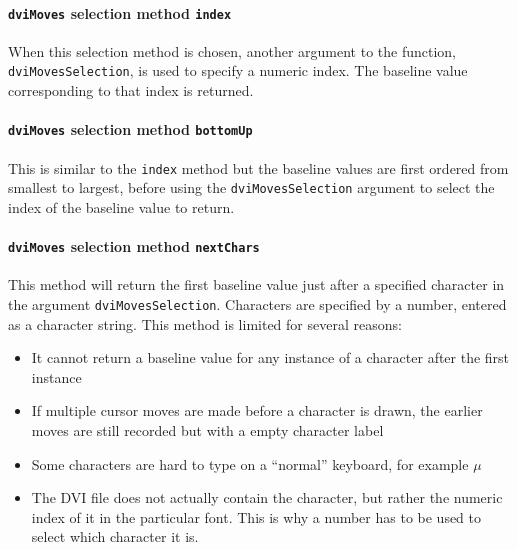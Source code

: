 \documentclass[]{article}
\providecommand{\tightlist}{%
  \setlength{\itemsep}{0pt}\setlength{\parskip}{0pt}}
\let\oldparagraph\paragraph
\renewcommand{\paragraph}[1]{\oldparagraph{#1}\mbox{}}
\begin{document}
\paragraph{\texorpdfstring{\texttt{dviMoves} selection method
\texttt{index}}{dviMoves selection method index}}\label{dvimoves-selection-method-index}

When this selection method is chosen, another argument to the function,
\texttt{dviMovesSelection}, is used to specify a numeric index. The
baseline value corresponding to that index is returned.

\paragraph{\texorpdfstring{\texttt{dviMoves} selection method
\texttt{bottomUp}}{dviMoves selection method bottomUp}}\label{dvimoves-selection-method-bottomup}

This is similar to the \texttt{index} method but the baseline values are
first ordered from smallest to largest, before using the
\texttt{dviMovesSelection} argument to select the index of the baseline
value to return.

\paragraph{\texorpdfstring{\texttt{dviMoves} selection method
\texttt{nextChars}}{dviMoves selection method nextChars}}\label{dvimoves-selection-method-nextchars}

This method will return the first baseline value just after a specified
character in the argument \texttt{dviMovesSelection}. Characters are
specified by a number, entered as a character string. This method is
limited for several reasons:

\begin{itemize}
\tightlist
\item
  It cannot return a baseline value for any instance of a character
  after the first instance
\item
  If multiple cursor moves are made before a character is drawn, the
  earlier moves are still recorded but with a empty character label
\item
  Some characters are hard to type on a ``normal'' keyboard, for example
  \(\mu\)
\item
  The DVI file does not actually contain the character, but rather the
  numeric index of it in the particular font. This is why a number has
  to be used to select which character it is.
\end{itemize}
\end{document}
